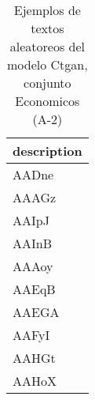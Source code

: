 \begin{table}[H]
\centering
\fontsize{8}{14}\selectfont
\caption{Ejemplos de textos aleatoreos del modelo Ctgan, conjunto Economicos (A-2)}
\label{table-sample10-economicos-a-2-ctgan-text}
\begin{tabular}{|m{50em}|}
\hline
\rowcolor[gray]{0.8}
description \\
\hline AADne \\
\hline AAAGz \\
\hline AAIpJ \\
\hline AAInB \\
\hline AAAoy \\
\hline AAEqB \\
\hline AAEGA \\
\hline AAFyI \\
\hline AAHGt \\
\hline AAHoX \\
\hline
\end{tabular}
\end{table}
